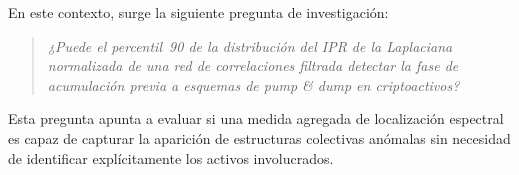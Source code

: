 En este contexto, surge la siguiente pregunta de investigación:

\begin{quote}
  \emph{¿Puede el percentil~90 de la distribución del IPR de la Laplaciana
  normalizada de una red de correlaciones filtrada detectar la fase de
  acumulación previa a esquemas de \emph{pump \& dump} en criptoactivos?}
\end{quote}

Esta pregunta apunta a evaluar si una medida agregada de localización espectral es capaz de capturar la aparición de estructuras colectivas anómalas sin necesidad de identificar explícitamente los activos involucrados.